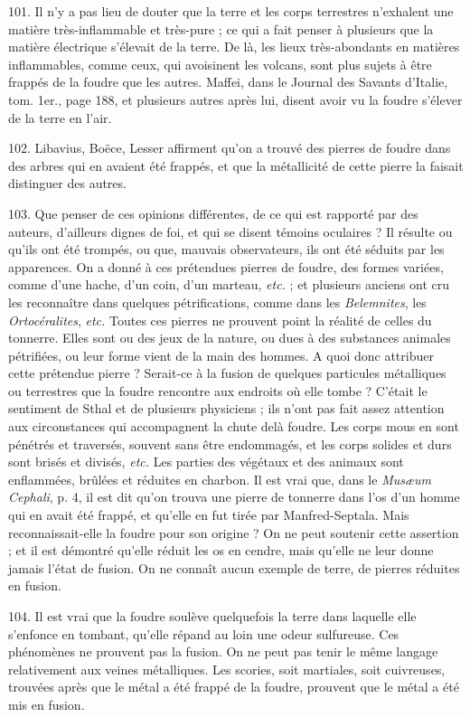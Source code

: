 \documentclass[a4paper, 11pt, oneside, polutonikogreek, french]{article}
\begin{document}
101. Il n'y a pas lieu de douter que la terre et les corps terrestres n'exhalent une matière très-inflammable et très-pure ; ce qui a fait penser à plusieurs que la matière électrique s'élevait de la terre. De là, les lieux très-abondants en matières inflammables, comme ceux, qui avoisinent les volcans, sont plus sujets à être frappés de la foudre que les autres. Maffei, dans le Journal des Savants d'Italie, tom. 1er., page 188, et plusieurs autres après lui, disent avoir vu la foudre s'élever de la terre en l'air.

102. Libavius, Boëce, Lesser affirment qu'on a trouvé des pierres de foudre dans des arbres qui en avaient été frappés, et que la métallicité de cette pierre la faisait distinguer des autres.

103. Que penser de ces opinions différentes, de ce qui est rapporté par des auteurs, d'ailleurs dignes de foi, et qui se disent témoins oculaires ? Il résulte ou qu'ils ont été trompés, ou que, mauvais observateurs, ils ont été séduits par les apparences. On a donné à ces prétendues pierres de foudre, des formes variées, comme d'une hache, d'un coin, d'un marteau, \emph{etc.} ; et plusieurs anciens ont cru les reconnaître dans quelques pétrifications, comme dans les \emph{Belemnites}, les \emph{Ortocéralites}, \emph{etc.} Toutes ces pierres ne prouvent point la réalité de celles du tonnerre. Elles sont ou des jeux de la nature, ou dues à des substances animales pétrifiées, ou leur forme vient de la main des hommes. A quoi donc attribuer cette prétendue pierre ? Serait-ce à la fusion de quelques particules métalliques ou terrestres que la foudre rencontre aux endroits où elle tombe ? C'était le sentiment de Sthal et de plusieurs physiciens ; ils n'ont pas fait assez attention aux circonstances qui accompagnent la chute delà foudre. Les corps mous en sont pénétrés et traversés, souvent sans être endommagés, et les corps solides et durs sont brisés et divisés, \emph{etc.} Les parties des végétaux et des animaux sont enflammées, brûlées et réduites en charbon. Il est vrai que, dans le \emph{Musæum Cephali}, p. 4, il est dit qu'on trouva une pierre de tonnerre dans l'os d'un homme qui en avait été frappé, et qu'elle en fut tirée par Manfred-Septala. Mais reconnaissait-elle la foudre pour son origine ? On ne peut soutenir cette assertion ; et il est démontré qu'elle réduit les os en cendre, mais qu'elle ne leur donne jamais l'état de fusion. On ne connaît aucun exemple de terre, de pierres réduites en fusion.

104. Il est vrai que la foudre soulève quelquefois la terre dans laquelle elle s'enfonce en tombant, qu'elle répand au loin une odeur sulfureuse. Ces phénomènes ne prouvent pas la fusion. On ne peut pas tenir le même langage relativement aux veines métalliques. Les scories, soit martiales, soit cuivreuses, trouvées après que le métal a été frappé de la foudre, prouvent que le métal a été mis en fusion.
\end{document}

